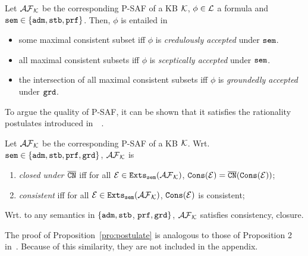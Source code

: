 \begin{theorem}
\label{thm:ab-link}
Let $\mathcal{AF}_{\mathcal{K}}$ be the corresponding P-SAF of a KB $\mathcal{K}$, $\phi \in \mathcal{L}$ a formula and $\texttt{\textup{sem}} \in \{\texttt{\textup{adm}}, \texttt{\textup{stb}}, \texttt{\textup{prf}} \}$. Then, $\phi$ is entailed in
\begin{itemize}
    \item some maximal consistent subset iff $\phi$ is \emph{credulously accepted} under $\texttt{\textup{sem}}$.
       
    \item all maximal consistent subsets iff $\phi$ is \emph{sceptically accepted} under $\texttt{\textup{sem}}$.
    
    \item the intersection of all maximal consistent subsets iff $\phi$ is \emph{groundedly accepted} under $\texttt{\textup{grd}}$.
   
\end{itemize}
\end{theorem}





To argue the quality of P-SAF, it can be shown that it satisfies the rationality postulates introduced in~~\cite{DAgostinoM18,AmgoudB13}. 

\begin{definition}
Let $\mathcal{AF}_{\mathcal{K}}$ be the corresponding P-SAF of a KB $\mathcal{K}$. Wrt. $\texttt{\textup{sem}} \in \{\texttt{\textup{adm}}, \texttt{\textup{stb}}, \texttt{\textup{prf}}, \texttt{\textup{grd}}\}$, $\mathcal{AF}_{\mathcal{K}}$ is 
    \begin{enumerate} 
	\item \emph{closed under $\overline{\texttt{\textup{CN}}}$} iff for all $\mathcal{E} \in \texttt{\textup{Exts}}_{\texttt{\textup{sem}}}(\mathcal{AF}_{\mathcal{K}})$, $\texttt{\textup{Cons}}(\mathcal{E}) = \overline{\texttt{\textup{CN}}}(\texttt{\textup{Cons}}(\mathcal{E}))$;
	\item \emph{consistent} iff for all $\mathcal{E} \in \texttt{\textup{Exts}}_{\texttt{\textup{sem}}}(\mathcal{AF}_{\mathcal{K}})$, $\texttt{\textup{Cons}}(\mathcal{E})$ is consistent;
    \end{enumerate}
\end{definition}

 \begin{proposition}
 \label{pro:postulate} Wrt. to any semantics in $\{\texttt{\textup{adm}} ,\texttt{\textup{stb}}$, $\texttt{\textup{prf}},\texttt{\textup{grd}}\}$, $\mathcal{AF}_{\mathcal{K}}$ satisfies consistency, closure.
\end{proposition}
The proof of Proposition~\ref{pro:postulate} is analogous to those of Proposition 2 in~\cite{loanho_2024}. Because of this similarity, they are not included in the appendix.



